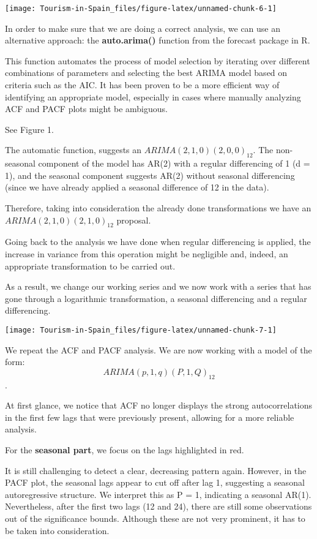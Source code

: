 \documentclass[
]{article}
\begin{document}
\begin{center}\texttt{[image: Tourism-in-Spain\_files/figure-latex/unnamed-chunk-6-1]} \end{center}

In order to make sure that we are doing a correct analysis, we can use
an alternative approach: the \textbf{auto.arima()} function from the
forecast package in R.

This function automates the process of model selection by iterating over
different combinations of parameters and selecting the best ARIMA model
based on criteria such as the AIC. It has been proven to be a more
efficient way of identifying an appropriate model, especially in cases
where manually analyzing ACF and PACF plots might be ambiguous.

See Figure 1.

The automatic function, suggests an \(ARIMA(2, 1, 0)(2, 0, 0)_{12}\).
The non-seasonal component of the model has AR(2) with a regular
differencing of 1 (d = 1), and the seasonal component suggests AR(2)
without seasonal differencing (since we have already applied a seasonal
difference of 12 in the data).

Therefore, taking into consideration the already done transformations we
have an \(ARIMA(2, 1, 0)(2, 1, 0)_{12}\) proposal.

Going back to the analysis we have done when regular differencing is
applied, the increase in variance from this operation might be
negligible and, indeed, an appropriate transformation to be carried out.

As a result, we change our working series and we now work with a series
that has gone through a logarithmic transformation, a seasonal
differencing and a regular differencing.

\begin{center}\texttt{[image: Tourism-in-Spain\_files/figure-latex/unnamed-chunk-7-1]} \end{center}

We repeat the ACF and PACF analysis. We are now working with a model of
the form: \[ARIMA(p, 1, q)(P, 1, Q)_{12}\].

At first glance, we notice that ACF no longer displays the strong
autocorrelations in the first few lags that were previously present,
allowing for a more reliable analysis.

For the \textbf{seasonal part}, we focus on the lags highlighted in red.

It is still challenging to detect a clear, decreasing pattern again.
However, in the PACF plot, the seasonal lags appear to cut off after lag
1, suggesting a seasonal autoregressive structure. We interpret this as
P = 1, indicating a seasonal AR(1). Nevertheless, after the first two
lags (12 and 24), there are still some observations out of the
significance bounds. Although these are not very prominent, it has to be
taken into consideration.
\end{document}
